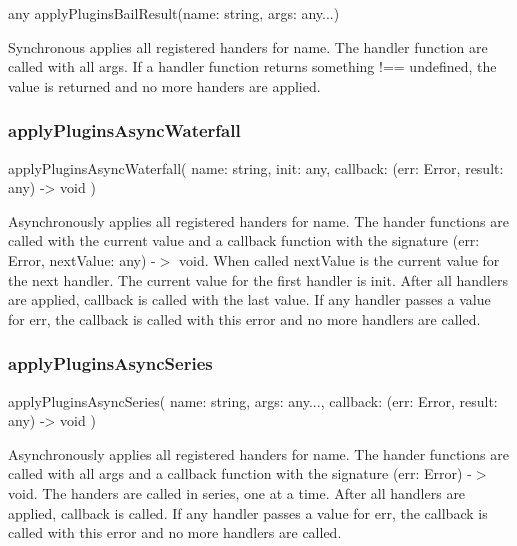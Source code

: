 \begin{DoxyCode}
any applyPluginsBailResult(name: string, args: any...)
\end{DoxyCode}


Synchronous applies all registered handers for {\ttfamily name}. The handler function are called with all args. If a handler function returns something {\ttfamily !== undefined}, the value is returned and no more handers are applied.

\subsubsection*{apply\+Plugins\+Async\+Waterfall}


\begin{DoxyCode}
applyPluginsAsyncWaterfall(
    name: string,
    init: any,
    callback: (err: Error, result: any) -> void
)
\end{DoxyCode}


Asynchronously applies all registered handers for {\ttfamily name}. The hander functions are called with the current value and a callback function with the signature {\ttfamily (err\+: Error, next\+Value\+: any) -\/$>$ void}. When called {\ttfamily next\+Value} is the current value for the next handler. The current value for the first handler is {\ttfamily init}. After all handlers are applied, {\ttfamily callback} is called with the last value. If any handler passes a value for {\ttfamily err}, the {\ttfamily callback} is called with this error and no more handlers are called.

\subsubsection*{apply\+Plugins\+Async\+Series}


\begin{DoxyCode}
applyPluginsAsyncSeries(
    name: string,
    args: any...,
    callback: (err: Error, result: any) -> void
)
\end{DoxyCode}


Asynchronously applies all registered handers for {\ttfamily name}. The hander functions are called with all {\ttfamily args} and a callback function with the signature {\ttfamily (err\+: Error) -\/$>$ void}. The handers are called in series, one at a time. After all handlers are applied, {\ttfamily callback} is called. If any handler passes a value for {\ttfamily err}, the {\ttfamily callback} is called with this error and no more handlers are called.

